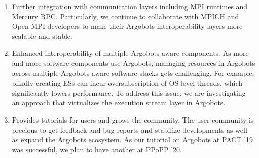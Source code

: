 \begin{enumerate}

\item Further integration with communication layers including MPI
runtimes and Mercury RPC. Particularly, we continue to collaborate
with MPICH and Open MPI developers to make their Argobots
interoperability layers more scalable and stable.

\item Enhanced interoperability of multiple Argobots-aware components.
As more and more software components use Argobots, managing resources
in Argobots across multiple Argobots-aware software stacks gets
challenging.  For example, blindly creating ESs can incur
oversubscription of OS-level threads, which significantly lowers
performance. To address this issue, we are investigating an approach
that virtualizes the execution stream layer in Argobots.

\item Provides tutorials for users and grows the community. The user
community is precious to get feedback and bug reports and stabilize
developments as well as expand the Argobots ecosystem. As our tutorial
on Argobots at PACT '19 was successful, we plan to have another at
PPoPP '20.

\end{enumerate}
